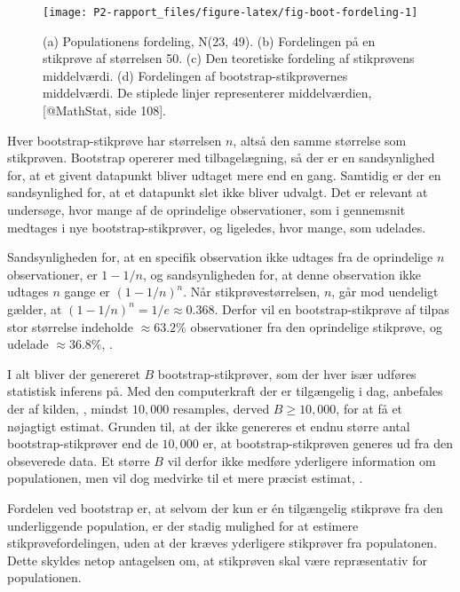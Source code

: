 \documentclass[
]{book}
\theoremstyle{definition}
\theoremstyle{definition}
\theoremstyle{definition}
\theoremstyle{remark}
\begin{document}
\begin{figure}

{\centering \texttt{[image: P2-rapport\_files/figure-latex/fig-boot-fordeling-1]}

}

\caption{(a) Populationens fordeling,  N(23, 49). (b) Fordelingen på en stikprøve af størrelsen 50. (c) Den teoretiske fordeling af stikprøvens middelværdi. (d) Fordelingen af bootstrap-stikprøvernes middelværdi. De stiplede linjer representerer middelværdien, [@MathStat, side 108].}\label{fig:fig-boot-fordeling}
\end{figure}

Hver bootstrap-stikprøve har størrelsen \(n\), altså den samme størrelse som stikprøven. Bootstrap opererer med tilbagelægning, så der er en sandsynlighed for, at et givent datapunkt bliver udtaget mere end en gang. Samtidig er der en sandsynlighed for, at et datapunkt slet ikke bliver udvalgt. Det er relevant at undersøge, hvor mange af de oprindelige observationer, som i gennemsnit medtages i nye bootstrap-stikprøver, og ligeledes, hvor mange, som udelades.

Sandsynligheden for, at en specifik observation ikke udtages fra de oprindelige \(n\) observationer, er \(1-1/n\), og sandsynligheden for, at denne observation ikke udtages \(n\) gange er \((1-1/n)^n\). Når stikprøvestørrelsen, \(n\), går mod uendeligt gælder, at \((1-1/n)^n = 1/e \approx 0.368\). Derfor vil en bootstrap-stikprøve af tilpas stor størrelse indeholde \(\approx 63.2\%\) observationer fra den oprindelige stikprøve, og udelade \(\approx 36.8\%\), \citep{SAS}.

I alt bliver der genereret \(B\) bootstrap-stikprøver, som der hver især udføres statistisk inferens på. Med den computerkraft der er tilgængelig i dag, anbefales der af kilden, \citep{BootYouTube1}, mindst \(10,000\) resamples, derved \(B \geq 10,000\), for at få et nøjagtigt estimat. Grunden til, at der ikke genereres et endnu større antal bootstrap-stikprøver end de \(10,000\) er, at bootstrap-stikprøven generes ud fra den obseverede data. Et større \(B\) vil derfor ikke medføre yderligere information om populationen, men vil dog medvirke til et mere præcist estimat, \citep[10:20]{BootYouTube1}.

Fordelen ved bootstrap er, at selvom der kun er én tilgængelig stikprøve fra den underliggende population, er der stadig mulighed for at estimere stikprøvefordelingen, uden at der kræves yderligere stikprøver fra populatonen. Dette skyldes netop antagelsen om, at stikprøven skal være repræsentativ for populationen.
\end{document}
